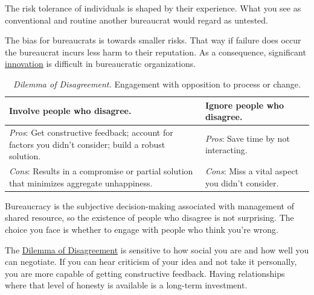 The risk tolerance of individuals is shaped by their experience. What you see as conventional and routine another bureaucrat would regard as untested. 

The bias for bureaucrats is towards smaller risks. That way if failure does occur the bureaucrat incurs less harm to their reputation. As a consequence, significant 
\hyperref[sec:innovation]{innovation} is difficult in bureaucratic organizations. 


\begin{center}
\begin{table}[H]
\begin{tabular}{ | m{\dilemmatablewidth}| m{\dilemmatablewidth} | } 
  \hline
  \textbf{Involve people who disagree.} & 
  \textbf{Ignore people who disagree.} \\ 
  \hline
  \textit{Pros}: Get constructive feedback; account for factors you didn't consider; build a robust solution. & 
  \textit{Pros}: Save time by not interacting. \\  
  \hline
  \textit{Cons}: Results in a compromise or partial solution that minimizes aggregate unhappiness. & 
  \textit{Cons}: Miss a vital aspect you didn't consider. \\  
  \hline
\end{tabular}
\caption{\textit{Dilemma of Disagreement.}
Engagement with opposition to process or change.
}
\label{table:dilemma-personal-opposition-involve-ignore}
\end{table}
\end{center}



Bureaucracy is the subjective decision-making associated with management of shared resource, so the existence of people who disagree is not surprising. The choice you face is whether to engage with people who think you're wrong. 

The \hyperref[table:dilemma-personal-opposition-involve-ignore]{Dilemma of Disagreement} is sensitive to how social you are and how well you can negotiate. If you can hear criticism of your idea and not take it personally, you are more capable of getting constructive feedback. Having relationships where that level of honesty is available is a long-term investment.

